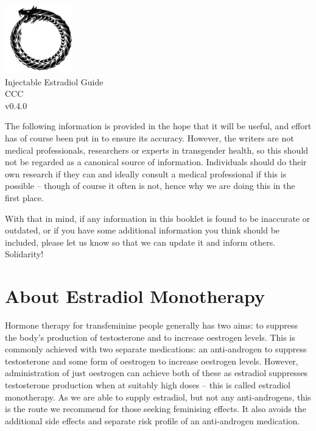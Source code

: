 \documentclass[twoside,a5paper]{article}
\begin{document}
\begin{titlepage}
  \null\vspace{2em}
  \setcounter{page}{0}
  \begin{center}
    \includegraphics[width=8em]{ouroboros} \\
    \vspace{3em}
    {\LARGE Injectable Estradiol Guide \\}
    \vspace{2em}
    {\large CCC \\}
    \vspace{0.6em}
    {\large v0.4.0 \\}
  \end{center}
\end{titlepage}

\setcounter{page}{1}
\clearpage
\hfill
\clearpage

\tableofcontents
\listoftables
\listoffigures

\newpage
{}

\noindent The following information is provided in the hope that it
will be useful, and effort has of course been put in to ensure its
accuracy.  However, the writers are not medical professionals,
researchers or experts in transgender health, so this should not be
regarded as a canonical source of information.  Individuals should do
their own research if they can and ideally consult a medical
professional if this is possible -- though of course it often is not,
hence why we are doing this in the first place.

With that in mind, if any information in this booklet is found to be
inaccurate or outdated, or if you have some additional information
you think should be included, please let us know so that we can update
it and inform others.  Solidarity!

\section{About Estradiol Monotherapy}

Hormone therapy for transfeminine people generally has two aims: to
suppress the body's production of testosterone and to increase
oestrogen levels.  This is commonly achieved with two separate
medications: an anti-androgen to suppress testosterone and some form
of oestrogen to increase oestrogen levels.  However, administration of
just oestrogen can achieve both of these as estradiol suppresses
testosterone production when at suitably high doses -- this is called
estradiol monotherapy.  As we are able to supply estradiol, but not
any anti-androgens, this is the route we recommend for those seeking
feminising effects.  It also avoids the additional side effects and
separate risk profile of an anti-androgen medication.
\end{document}
